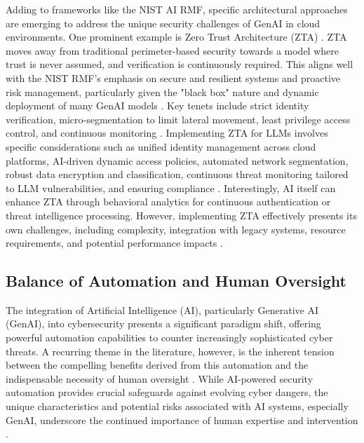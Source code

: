 Adding to frameworks like the NIST AI RMF, specific architectural approaches are emerging to address the unique security challenges of GenAI in cloud environments. One prominent example is Zero Trust Architecture (ZTA) \cite{noauthor_zero-trust_nodate}. ZTA moves away from traditional perimeter-based security towards a model where trust is never assumed, and verification is continuously required\cite{noauthor_zero-trust_nodate}. This aligns well with the NIST RMF's emphasis on secure and resilient systems and proactive risk management, particularly given the "black box" nature and dynamic deployment of many GenAI models \cite{noauthor_zero-trust_nodate, tabassi_artificial_2023}. Key tenets include strict identity verification, micro-segmentation to limit lateral movement, least privilege access control, and continuous monitoring \cite{noauthor_zero-trust_nodate}. Implementing ZTA for LLMs involves specific considerations such as unified identity management across cloud platforms, AI-driven dynamic access policies, automated network segmentation, robust data encryption and classification, continuous threat monitoring tailored to LLM vulnerabilities, and ensuring compliance \cite{noauthor_zero-trust_nodate}. Interestingly, AI itself can enhance ZTA through behavioral analytics for continuous authentication or threat intelligence processing\cite{noauthor_zero-trust_nodate}. However, implementing ZTA effectively presents its own challenges, including complexity, integration with legacy systems, resource requirements, and potential performance impacts \cite{noauthor_zero-trust_nodate}.

\subsection{Balance of Automation and Human Oversight} %
\label{sec:Balance of Automation and Human Oversight}

The integration of Artificial Intelligence (AI), particularly Generative AI (GenAI), into cybersecurity presents a significant paradigm shift, offering powerful automation capabilities to counter increasingly sophisticated cyber threats. A recurring theme in the literature, however, is the inherent tension between the compelling benefits derived from this automation and the indispensable necessity of human oversight \cite{seth_ai_2025}. While AI-powered security automation provides crucial safeguards against evolving cyber dangers, the unique characteristics and potential risks associated with AI systems, especially GenAI, underscore the continued importance of human expertise and intervention \cite{seth_ai_2025, patel_generative_2025}.

